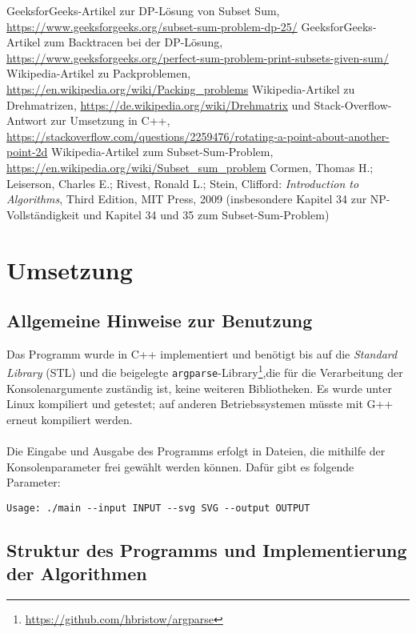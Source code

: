\documentclass[a4paper, notitlepage, 12pt]{scrartcl}
\begin{document}
\begin{thebibliography}{xx}
	 GeeksforGeeks-Artikel zur DP-Lösung von Subset Sum, \url{https://www.geeksforgeeks.org/subset-sum-problem-dp-25/}
	 GeeksforGeeks-Artikel zum Backtracen bei der DP-Lösung, \url{https://www.geeksforgeeks.org/perfect-sum-problem-print-subsets-given-sum/}
	 Wikipedia-Artikel zu Packproblemen, \url{https://en.wikipedia.org/wiki/Packing_problems}
	 Wikipedia-Artikel zu Drehmatrizen, \url{https://de.wikipedia.org/wiki/Drehmatrix} und Stack-Overflow-Antwort zur Umsetzung in C++, \url{https://stackoverflow.com/questions/2259476/rotating-a-point-about-another-point-2d}
	 Wikipedia-Artikel zum Subset-Sum-Problem, \url{https://en.wikipedia.org/wiki/Subset_sum_problem}
	 Cormen, Thomas H.; Leiserson, Charles E.; Rivest, Ronald L.; Stein, Clifford: \textit{Introduction to Algorithms}, Third Edition, MIT Press, 2009 (insbesondere Kapitel 34 zur NP-Vollständigkeit und Kapitel 34 und 35 zum Subset-Sum-Problem)
\end{thebibliography}
\section{Umsetzung}
\subsection{Allgemeine Hinweise zur Benutzung}
Das Programm wurde in C++ implementiert und benötigt bis auf die \textit{Standard Library} (STL) und die beigelegte \texttt{argparse}-Library\footnote{\url{https://github.com/hbristow/argparse}},die für die Verarbeitung der Konsolenargumente zuständig ist, keine weiteren Bibliotheken. Es wurde unter Linux kompiliert und getestet; auf anderen Betriebssystemen müsste mit G++ erneut kompiliert werden. \\ \\
Die Eingabe und Ausgabe des Programms erfolgt in Dateien, die mithilfe der Konsolenparameter frei gewählt werden können. Dafür gibt es folgende Parameter:
\begin{verbatim}
Usage: ./main --input INPUT --svg SVG --output OUTPUT
\end{verbatim}
\subsection{Struktur des Programms und Implementierung der Algorithmen}
\end{document}
